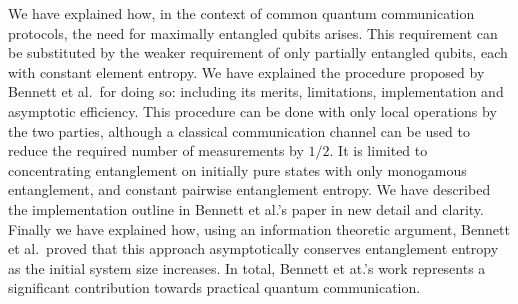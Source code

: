 We have explained how, in the context of common quantum communication protocols, the need for maximally entangled qubits arises.
This requirement can be substituted by the weaker requirement of only partially entangled qubits, each with constant element entropy.
We have explained the procedure proposed by Bennett et al.\ for doing so: including its merits, limitations, implementation and asymptotic efficiency. 
This procedure can be done with only local operations by the two parties, although a classical communication channel can be used to reduce the required number of measurements by $1/2$.
It is limited to concentrating entanglement on initially pure states with only monogamous entanglement, and constant pairwise entanglement entropy.
We have described the implementation outline in Bennett et al.'s paper in new detail and clarity.
Finally we have explained how, using an information theoretic argument, Bennett et al.\ proved that this approach asymptotically conserves entanglement entropy as the initial system size increases.
In total, Bennett et at.'s work represents a significant contribution towards practical quantum communication.